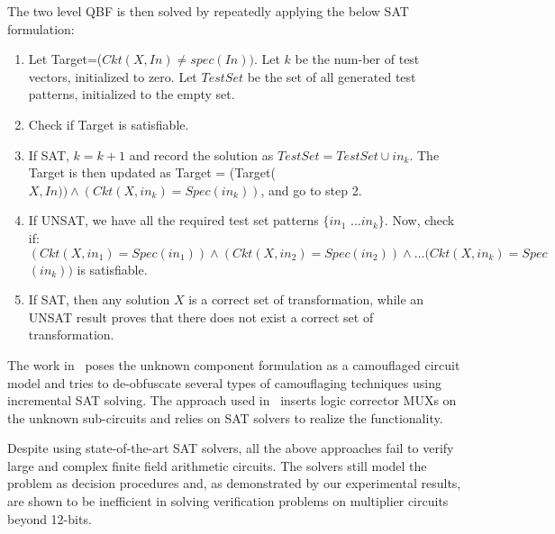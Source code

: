 The two level QBF is then solved by repeatedly applying the below SAT formulation:
  
\begin{enumerate}
	\item Let Target=($Ckt(X,In)\neq spec(In))$. Let $k$ be the num-ber of test vectors, initialized to zero. Let $TestSet$ be the set of all generated test patterns, initialized to the empty set.
	\item Check if Target is satisfiable.
	\item If SAT, $k=k+1$ and record the solution as $TestSet = TestSet \cup in_k$. The Target is then updated as Target = (Target($X,In))\land(Ckt(X,in_k)=Spec(in_k))$, and go to step 2.
    \item If UNSAT, we have all the required test set patterns $\{in_1$ $\dots in_k\}$. Now, check if: $(Ckt(X,in_1) = Spec(in_1)) \land (Ckt(X,in_2) = Spec(in_2)) \land \dots (Ckt(X,in_k) = Spec$ $(in_k))$ is satisfiable.
    \item If SAT, then any solution $X$ is a correct set of transformation, while an UNSAT result proves that there does not exist a correct set of transformation.
\end{enumerate}

The work in~\cite{maciej:2017} poses the unknown component formulation as a camouflaged circuit model and tries to de-obfuscate several types of camouflaging techniques using incremental SAT solving. The approach used in~\cite{andreas:2005} inserts logic corrector MUXs on the unknown sub-circuits and relies on SAT solvers to realize the functionality. 

Despite using state-of-the-art SAT solvers, all the above approaches fail to verify large and complex finite field arithmetic circuits. The solvers still model the problem as decision procedures and, as demonstrated by our experimental results, are shown to be inefficient in solving verification problems on multiplier circuits beyond 12-bits. 

